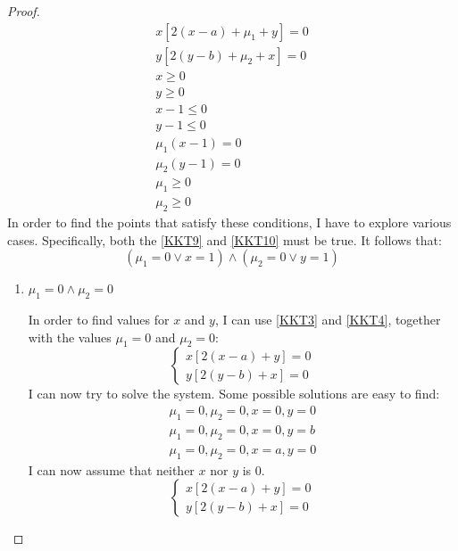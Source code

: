 \begin{proof}
\begin{gather}
        x[2(x-a) + \mu_1 + y] = 0 \label{KKT3} \tag{KTT3} \\
        y[2(y-b) + \mu_2 + x] = 0 \label{KKT4} \tag{KKT4} \\
        x \geq 0 \label{KKT5} \tag{KKT5} \\
        y \geq 0 \label{KKT6} \tag{KKT6} \\
        x - 1 \leq 0 \label{KKT7} \tag{KKT7} \\
        y - 1 \leq 0 \label{KKT8} \tag{KKT8} \\
        \mu_1(x - 1) = 0 \label{KKT9} \tag{KKT9} \\
        \mu_2(y - 1) = 0 \label{KKT10} \tag{KKT10} \\
        \mu_1 \geq 0 \label{KKT11} \tag{KKT11} \\
        \mu_2 \geq 0 \label{KKT12} \tag{KKT12} 
    \end{gather}
    In order to find the points that satisfy these conditions, I have to explore various cases. Specifically, both the \eqref{KKT9} and \eqref{KKT10} must be true. It follows that:
    \[(\mu_1 = 0 \lor x = 1) \land (\mu_2 = 0 \lor y = 1)\]
    \begin{enumerate}
        \item \(\mu_1 = 0 \land \mu_2 = 0\)\par
            In order to find values for \(x\) and \(y\), I can use \eqref{KKT3} and \eqref{KKT4}, together with the values \(\mu_1 = 0\) and \(\mu_2 = 0\):
            \[
                \begin{cases}
                    x[2(x-a) + y] = 0 \\
                    y[2(y-b) + x] = 0
                \end{cases}
            \]
            I can now try to solve the system. Some possible solutions are easy to find:
            \begin{gather}
                \mu_1 = 0, \mu_2 = 0, x = 0, y = 0 \label{SOL1} \tag{SOL1} \\
                \mu_1 = 0, \mu_2 = 0, x = 0, y = b \label{SOL2} \tag{SOL2} \\
                \mu_1 = 0, \mu_2 = 0, x = a, y = 0 \label{SOL3} \tag{SOL3}
            \end{gather}
            I can now assume that neither \(x\) nor \(y\) is \(0\).
            \[
                \begin{cases}
                    x[2(x-a) + y] = 0 \\
                    y[2(y-b) + x] = 0

\end{cases}\]
\end{enumerate}
\end{proof}
